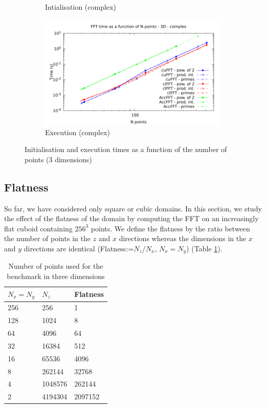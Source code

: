 \documentclass[12pt, a4paper]{article}
\begin{document}
\begin{figure}[H]
\begin{subfigure}{.5\textwidth}
\caption{Intialisation (complex)}
\label{FFT3DCI}
\end{subfigure}%
\begin{subfigure}{.5\textwidth}
\centering
\includegraphics[width=.9\linewidth]{graphs/fft-3d-c-exec.pdf}
\caption{Execution (complex)}
\label{FFT3DCE}
\end{subfigure}
\caption{Initialisation and execution times as a function of the number of points (3 dimensions)}
\label{FFT3D}
\end{figure}

\subsection{Flatness}\label{FLATNESS}
So far, we have considered only square or cubic domains. In this section, we study the effect of the flatness of the domain by computing the FFT on an increasingly flat cuboid containing $256^3$ points. We define the flatness by the ratio between the number of points in the $z$ and $x$ directions whereas the dimensions in the $x$ and $y$ directions are identical (Flatness:=$N_z/N_x$, $N_x=N_y$) (Table \ref{FLATNESSDIM}). 

\begin{table}[H]
\centering
\begin{tabular}{|l|l|l|}
\hline
$N_x=N_y$ & $N_z $ & Flatness\\ 
\hline
\hline
256 & 256 & 1\\ \hline
128 & 1024 & 8\\ \hline
64 & 4096 & 64\\ \hline
32 & 16384 & 512\\ \hline
16 & 65536 & 4096\\ \hline
8 & 262144 & 32768\\ \hline
4 & 1048576 & 262144\\ \hline 
2 & 4194304 & 2097152\\ \hline
\end{tabular}
\caption{Number of points used for the benchmark in three dimensions}\label{FLATNESSDIM}
\end{table}
\end{document}
